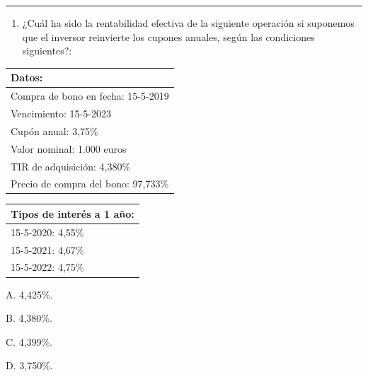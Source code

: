 \documentclass[
  letterpaper,
  DIV=11,
  numbers=noendperiod]{scrreprt}
\providecommand{\tightlist}{%
  \setlength{\itemsep}{0pt}\setlength{\parskip}{0pt}}\usepackage{longtable,booktabs,array}
\begin{document}
\begin{center}\rule{0.5\linewidth}{0.5pt}\end{center}

\begin{enumerate}
\def\labelenumi{\arabic{enumi}.}
\setcounter{enumi}{95}
\tightlist
\item
  ¿Cuál ha sido la rentabilidad efectiva de la siguiente operación si
  suponemos que el inversor reinvierte los cupones anuales, según las
  condiciones siguientes?:
\end{enumerate}

\begin{longtable}[]{@{}l@{}}
\toprule()
\textbf{Datos:} \\
\midrule()
\endhead
Compra de bono en fecha: 15-5-2019 \\
Vencimiento: 15-5-2023 \\
Cupón anual: 3,75\% \\
Valor nominal: 1.000 euros \\
TIR de adquisición: 4,380\% \\
Precio de compra del bono: 97,733\% \\
\bottomrule()
\end{longtable}

\begin{longtable}[]{@{}l@{}}
\toprule()
\textbf{Tipos de interés a 1 año:} \\
\midrule()
\endhead
15-5-2020: 4,55\% \\
15-5-2021: 4,67\% \\
15-5-2022: 4,75\% \\
\bottomrule()
\end{longtable}

A. 4,425\%.

B. 4,380\%.

C. 4,399\%.

D. 3,750\%.
\end{document}
